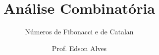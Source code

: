 \title{Análise Combinatória}
\subtitle{Números de Fibonacci e de Catalan}
\author{Prof. Edson Alves}
\date{}
